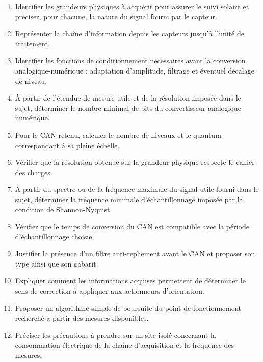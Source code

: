 \begin{enumerate}
  \item Identifier les grandeurs physiques à acquérir pour assurer le suivi solaire et préciser, pour chacune, la nature du signal fourni par le capteur.
  \item Représenter la chaîne d'information depuis les capteurs jusqu'à l'unité de traitement.
  \item Identifier les fonctions de conditionnement nécessaires avant la conversion analogique-numérique : adaptation d'amplitude, filtrage et éventuel décalage de niveau.
  \item À partir de l'étendue de mesure utile et de la résolution imposée dans le sujet, déterminer le nombre minimal de bits du convertisseur analogique-numérique.
  \item Pour le CAN retenu, calculer le nombre de niveaux et le quantum correspondant à sa pleine échelle.
  \item Vérifier que la résolution obtenue sur la grandeur physique respecte le cahier des charges.
  \item À partir du spectre ou de la fréquence maximale du signal utile fourni dans le sujet, déterminer la fréquence minimale d'échantillonnage imposée par la condition de Shannon-Nyquist.
  \item Vérifier que le temps de conversion du CAN est compatible avec la période d'échantillonnage choisie.
  \item Justifier la présence d'un filtre anti-repliement avant le CAN et proposer son type ainsi que son gabarit.
  \item Expliquer comment les informations acquises permettent de déterminer le sens de correction à appliquer aux actionneurs d'orientation.
  \item Proposer un algorithme simple de poursuite du point de fonctionnement recherché à partir des mesures disponibles.
  \item Préciser les précautions à prendre sur un site isolé concernant la consommation électrique de la chaîne d'acquisition et la fréquence des mesures.
\end{enumerate}

\begin{center}
\end{center}
